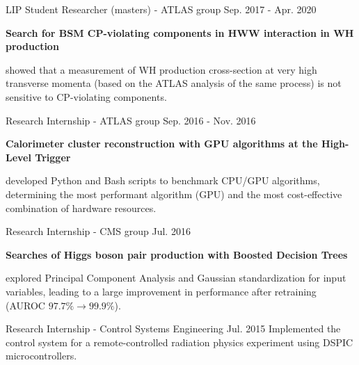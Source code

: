 \begin{cventries}

    \cventry
    {LIP}
    {Student Researcher (masters) - ATLAS group}
    {}
    {Sep. 2017 - Apr. 2020}
    {
        \textbf{Search for BSM CP-violating components in HWW interaction in WH production}\vspace{12pt}
        \begin{cvitems}      
            \item {showed that a measurement of WH production cross-section at very high transverse momenta (based on the ATLAS analysis of the same process) is not sensitive to CP-violating components.}
        \end{cvitems}
    }

    {Research Internship - ATLAS group}
    {}
    {Sep. 2016 - Nov. 2016}
    {   
        \textbf{Calorimeter cluster reconstruction with GPU algorithms at the High-Level Trigger}\vspace{14pt}
        \begin{cvitems}
            \item {developed Python and Bash scripts to benchmark CPU/GPU algorithms, determining the most performant algorithm (GPU) and the most cost-effective combination of hardware resources.}
        \end{cvitems}
    }

    {Research Internship - CMS group}
    {}
    {Jul. 2016}
    {
        \textbf{Searches of Higgs boson pair production with Boosted Decision Trees}\vspace{14pt}
        \begin{cvitems}
            \item {explored Principal Component Analysis and Gaussian standardization for input variables, leading to a large improvement in performance after retraining (AUROC $97.7\% \to 99.9\%$).}
        \end{cvitems}
    }

    {Research Internship - Control Systems Engineering}
    {}
    {Jul. 2015}
    {Implemented the control system for a remote-controlled radiation physics experiment using DSPIC microcontrollers.}

\end{cventries}